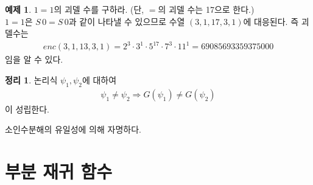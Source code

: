 \documentclass[b5paper, 11pt]{book}
\theoremstyle{definition}
\newtheorem{thm}[defn]{정리}
\newtheorem{ex}[defn]{예제}
\newenvironment{pf*}{\pushQED{\qed}\pf}
{\popQED\endpf}
\begin{document}
\begin{ex}
    $1 = 1$의 괴델 수를 구하라. (단, $=$의 괴델 수는 17으로 한다.) \\ 
    $1 = 1$은 $S\, 0 = S\, 0$과 같이 나타낼 수 있으므로 수열 $(3, 1, 17, 3, 1)$에 대응된다. 즉 괴델수는 
    \begin{align*}
        enc(3, 1, 13, 3, 1) = 2^3 \cdot 3^1 \cdot 5^{17} \cdot 7^3 \cdot 11^1 = 69085693359375000
    \end{align*}
    임을 알 수 있다.
\end{ex}
\begin{thm}
    논리식 $\psi_1, \psi_2$에 대하여
    \begin{align*}
        \psi_1 \neq \psi_2 \Rightarrow G(\psi_1) \neq G(\psi_2)
    \end{align*}
    이 성립한다. 
\end{thm}
\begin{pf*}
    소인수분해의 유일성에 의해 자명하다.
\end{pf*}
\section{부분 재귀 함수}
\end{document}
